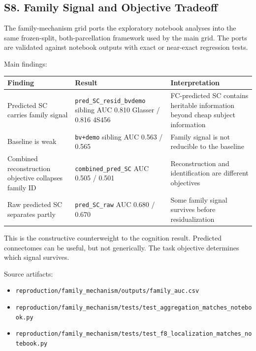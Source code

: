 \subsection{S8. Family Signal and Objective Tradeoff}\label{s8-family-signal-and-objective-tradeoff}

The family-mechanism grid ports the exploratory notebook analyses into the same frozen-split, both-parcellation framework used by the main grid. The ports are validated against notebook outputs with exact or near-exact regression tests.

Main findings:

{\def\LTcaptype{none} %
\begin{longtable}[]{@{}lll@{}}
\toprule\noalign{}
Finding & Result & Interpretation \\
\midrule\noalign{}
\endhead
\bottomrule\noalign{}
\endlastfoot
Predicted SC carries family signal & \texttt{pred\_SC\_resid\_bvdemo} sibling AUC 0.810 Glasser / 0.816 4S456 & FC-predicted SC contains heritable information beyond cheap subject information \\
Baseline is weak & \texttt{bv+demo} sibling AUC 0.563 / 0.565 & Family signal is not reducible to the baseline \\
Combined reconstruction objective collapses family ID & \texttt{combined\_pred\_SC} AUC 0.505 / 0.501 & Reconstruction and identification are different objectives \\
Raw predicted SC separates partly & \texttt{pred\_SC\_raw} AUC 0.680 / 0.670 & Some family signal survives before residualization \\
\end{longtable}
}

This is the constructive counterweight to the cognition result. Predicted connectomes can be useful, but not generically. The task objective determines which signal survives.

Source artifacts:

\begin{itemize}
\tightlist
\item
  \texttt{reproduction/family\_mechanism/outputs/family\_auc.csv}
\item
  \texttt{reproduction/family\_mechanism/tests/test\_aggregation\_matches\_notebook.py}
\item
  \texttt{reproduction/family\_mechanism/tests/test\_f8\_localization\_matches\_notebook.py}
\end{itemize}

